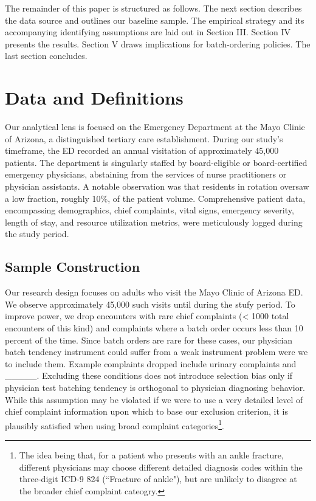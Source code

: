 \documentclass[,,nonblindrev]{informs}
\begin{document}
The remainder of this paper is structured as follows. The next section
describes the data source and outlines our baseline sample. The
empirical strategy and its accompanying identifying assumptions are laid
out in Section III. Section IV presents the results. Section V draws
implications for batch-ordering policies. The last section concludes.

\hypertarget{sec:II}{%
\section{Data and Definitions}\label{sec:II}}

Our analytical lens is focused on the Emergency Department at the Mayo
Clinic of Arizona, a distinguished tertiary care establishment. During
our study's timeframe, the ED recorded an annual visitation of
approximately 45,000 patients. The department is singularly staffed by
board-eligible or board-certified emergency physicians, abstaining from
the services of nurse practitioners or physician assistants. A notable
observation was that residents in rotation oversaw a low fraction,
roughly 10\%, of the patient volume. Comprehensive patient data,
encompassing demographics, chief complaints, vital signs, emergency
severity, length of stay, and resource utilization metrics, were
meticulously logged during the study period.

\hypertarget{sample-construction}{%
\subsection{Sample Construction}\label{sample-construction}}

Our research design focuses on adults who visit the Mayo Clinic of
Arizona ED. We observe approximately 45,000 such visits until during the
stufy period. To improve power, we drop encounters with rare chief
complaints (\textless{} 1000 total encounters of this kind) and
complaints where a batch order occurs less than 10 percent of the time.
Since batch orders are rare for these cases, our physician batch
tendency instrument could suffer from a weak instrument problem were we
to include them. Example complaints dropped include urinary complaints
and \_\_\_\_\_. Excluding these conditions does not introduce selection
bias only if physician test batching tendency is orthogonal to physician
diagnosing behavior. While this assumption may be violated if we were to
use a very detailed level of chief complaint information upon which to
base our exclusion criterion, it is plausibly satisfied when using broad
complaint
categories\footnote{The idea being that, for a patient who presents with an ankle fracture, different physicians may choose different detailed diagnosis codes within the three-digit ICD-9 824 (``Fracture of ankle"), but are unlikely to disagree at the broader chief complaint cateogry.}.
\end{document}
